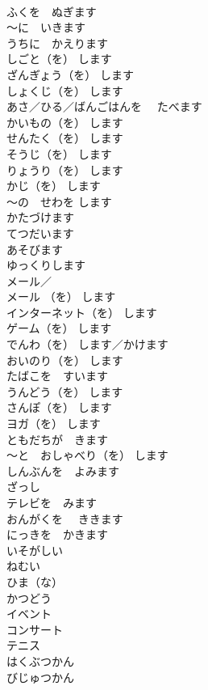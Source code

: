 \documentclass[8pt]{extreport}
\begin{document}
\begin{CJK}{UTF8}{min}
\\	ふくを　ぬぎます	
\\	～に　いきます	
\\	うちに　かえります	
\\	しごと（を） します	
\\	ざんぎょう（を） します	
\\	しょくじ（を） します	
\\	あさ／ひる／ばんごはんを　 たべます	
\\	かいもの（を） します	
\\	せんたく（を） します	
\\	そうじ（を） します	
\\	りょうり（を） します	
\\	かじ（を） します	
\\	～の　せわを します	
\\	かたづけます	
\\	てつだいます	
\\	あそびます	
\\	ゆっくりします	
\\	メール／ 
\\	メール （を） します	
\\	インターネット（を） します	
\\	ゲーム（を） します	
\\	でんわ（を） します／かけます	
\\	おいのり（を） します	
\\	たばこを　すいます	
\\	うんどう（を） します	
\\	さんぽ（を） します	
\\	ヨガ（を） します	
\\	ともだちが　きます	
\\	～と　おしゃべり（を） します	
\\	しんぶんを　よみます	
\\	ざっし	
\\	テレビを　みます	
\\	おんがくを　 ききます	
\\	にっきを　かきます	
\\	いそがしい	
\\	ねむい	
\\	ひま（な）	
\\	かつどう 
\\	イベント	
\\	コンサート	
\\	テニス	
\\	はくぶつかん	
\\	びじゅつかん	

\end{CJK}
\end{document}
